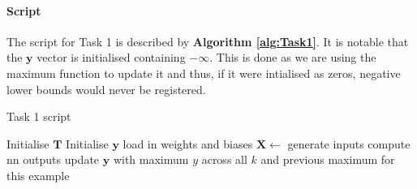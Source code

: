 \documentclass[11pt]{article}
\begin{document}
\paragraph{Script}
The script for Task 1 is described by \textbf{Algorithm \ref{alg:Task1}}.
It is notable that the $\boldsymbol{y}$ vector is initialised containing $-\infty$. This is done as we are using the maximum function to update it and thus, if it were intialised as zeros, negative lower bounds would never be registered.
\begin{algorithm}
    \caption{Task 1 script}\label{alg:Task1}
    \begin{algorithmic}
    \State Initialise $\boldsymbol{T}$ 
    \State Initialise $\boldsymbol{y}$ 
    \State load in weights and biases
    \State $\boldsymbol{X} \gets$ generate inputs
    \State compute nn outputs
    \State update $\boldsymbol{y}$ with maximum $y$ across all $k$ and previous maximum for this example
    \EndFor
    \EndFor
    \end{algorithmic}
\end{algorithm}
\end{document}
